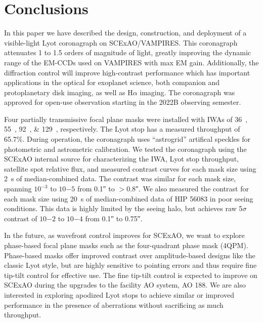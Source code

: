 \documentclass[]{spie}  %
\begin{document}
\section{Conclusions}\label{sec:conclusions}

In this paper we have described the design, construction, and deployment of a visible-light Lyot coronagraph on SCExAO/VAMPIRES. This coronagraph attenuates 1 to 1.5 orders of magnitude of light, greatly improving the dynamic range of the EM-CCDs used on VAMPIRES with max EM gain. Additionally, the diffraction control will improve high-contrast performance which has important applications in the optical for exoplanet science, both companion and protoplanetary disk imaging, as well as H$\alpha$ imaging. The coronagraph was approved for open-use observation starting in the 2022B observing semester.

Four partially transmissive focal plane masks were installed with IWAs of \qtylist{36;55;92;129}{\milliarcsecond}, respectively. The Lyot stop has a measured throughput of 65.7\%. During operation, the coronagraph uses ``astrogrid'' artifical speckles for photometric and astrometric calibration. We tested the coronagraph using the SCExAO internal source for characterizing the IWA, Lyot stop throughput, satellite spot relative flux, and measured contrast curves for each mask size using \qty{2}{\second} of median-combined data. The contrast was similar for each mask size, spanning $10^{-3}$ to $10{-5}$ from \ang{;;0.1} to $>$\ang{;;0.8}. We also measured the contrast for each mask size using \qty{20}{\second} of median-combined data of HIP 56083 in poor seeing conditions. This data is highly limited by the seeing halo, but achieves raw 5$\sigma$ contrast of $10{-2}$ to $10{-4}$ from \ang{;;0.1} to \ang{;;0.75}.

In the future, as wavefront control improves for SCExAO, we want to explore phase-based focal plane masks such as the four-quadrant phase mask (4QPM)\cite{rouanFourQuadrantPhase2007}. Phase-based masks offer improved contrast over amplitude-based designs like the classic Lyot style, but are highly sensitive to pointing errors and thus require fine tip-tilt control for effective use\cite{huby2017}. The fine tip-tilt control is expected to improve on SCExAO during the upgrades to the facility AO system, AO 188. We are also interested in exploring apodized Lyot stops to achieve similar or improved performance in the presence of aberrations without sacrificing as much throughput.

\end{document}
